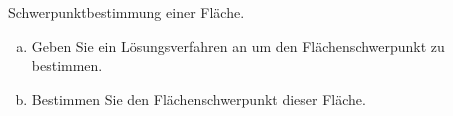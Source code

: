 
\begin{aufgabe}
	Schwerpunktbestimmung einer Fläche.
	\begin{enumerate} [a)]
		\item Geben Sie ein Lösungsverfahren an um den Flächenschwerpunkt zu bestimmen.
		\item Bestimmen Sie den Flächenschwerpunkt dieser Fläche.
	\end{enumerate}
	\begin{center}
	\end{center}
\end{aufgabe}


